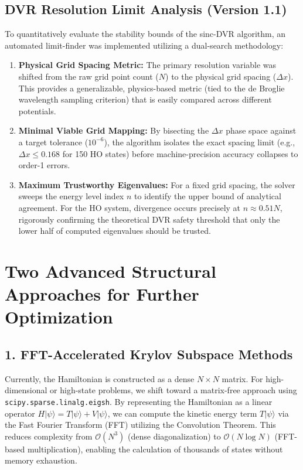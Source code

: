 \documentclass{article}
\numberwithin{equation}{subsection}
\begin{document}
\subsection*{DVR Resolution Limit Analysis (Version 1.1)}
To quantitatively evaluate the stability bounds of the sinc-DVR algorithm, an automated limit-finder was implemented utilizing a dual-search methodology:

\begin{enumerate}[label=\textbf{\arabic*.}]
    \item \textbf{Physical Grid Spacing Metric:} The primary resolution variable was shifted from the raw grid point count ($N$) to the physical grid spacing ($\Delta x$). This provides a generalizable, physics-based metric (tied to the de Broglie wavelength sampling criterion) that is easily compared across different potentials.
    \item \textbf{Minimal Viable Grid Mapping:} By bisecting the $\Delta x$ phase space against a target tolerance ($10^{-6}$), the algorithm isolates the exact spacing limit (e.g., $\Delta x \leq 0.168$ for 150 HO states) before machine-precision accuracy collapses to order-1 errors.
    \item \textbf{Maximum Trustworthy Eigenvalues:} For a fixed grid spacing, the solver sweeps the energy level index $n$ to identify the upper bound of analytical agreement. For the HO system, divergence occurs precisely at $n \approx 0.51 N$, rigorously confirming the theoretical DVR safety threshold that only the lower half of computed eigenvalues should be trusted.
\end{enumerate}

\section{Two Advanced Structural Approaches for Further Optimization}
\subsection*{1. FFT-Accelerated Krylov Subspace Methods}
Currently, the Hamiltonian is constructed as a dense $N \times N$ matrix. For high-dimensional or high-state problems, we shift toward a matrix-free approach using \texttt{scipy.sparse.linalg.eigsh}. By representing the Hamiltonian as a linear operator $H|\psi\rangle = T|\psi\rangle + V|\psi\rangle$, we can compute the kinetic energy term $T|\psi\rangle$ via the Fast Fourier Transform (FFT) utilizing the Convolution Theorem. This reduces complexity from $\mathcal{O}(N^3)$ (dense diagonalization) to $\mathcal{O}(N \log N)$ (FFT-based multiplication), enabling the calculation of thousands of states without memory exhaustion.
\end{document}

